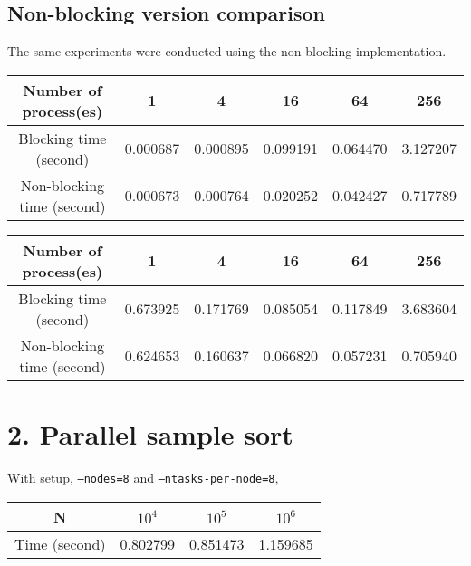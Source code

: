 \documentclass[amsmath,amssymb]{revtex4}
\begin{document}
\subsection{\label{sec:sec1.3}Non-blocking version comparison}
The same experiments were conducted using the non-blocking implementation.
\begin{center}
  \begin{tabular}{c | c | c | c | c | c}
    \hline
Number of process(es) & 1  & 4 & 16 & 64 &256     \\ \hline
Blocking time (second)    & 0.000687 & 0.000895 & 0.099191 & 0.064470 & 3.127207 \\ \hline
Non-blocking time (second) & 0.000673 & 0.000764&  0.020252& 0.042427 & 0.717789\\ \hline
  \end{tabular}
\end{center}

\begin{center}
  \begin{tabular}{c | c | c | c | c | c}
    \hline
Number of process(es) & 1  & 4 & 16 & 64 &256     \\ \hline
Blocking time        (second)  & 0.673925 & 0.171769 & 0.085054 & 0.117849 & 3.683604 \\ \hline
Non-blocking time (second) & 0.624653 & 0.160637& 0.066820 &  0.057231& 0.705940 \\ \hline
  \end{tabular}
\end{center}

\section{\label{sec:sec2}2. Parallel sample sort}
With setup, {\tt --nodes=8} and {\tt --ntasks-per-node=8}, 

\begin{center}
  \begin{tabular}{c | c | c | c }
    \hline
N & $10^4$  & $10^5$ & $10^6$    \\ \hline
Time (second) & 0.802799 & 0.851473&  1.159685\\ \hline
  \end{tabular}
\end{center}
\end{document}
